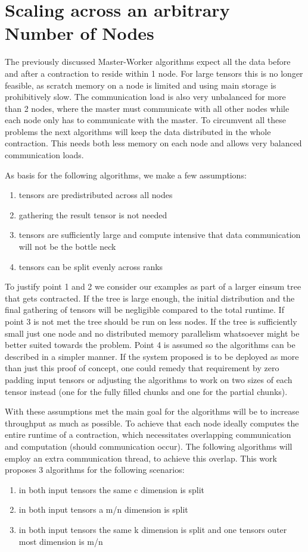 \section{Scaling across an arbitrary Number of Nodes}

The previously discussed Master-Worker algorithms expect all the data before and after a contraction to reside within 1 node.
For large tensors this is no longer feasible, as scratch memory on a node is limited and using main storage is prohibitively slow.
The communication load is also very unbalanced for more than 2 nodes, where the master must communicate with all other nodes while each node only has to communicate with the master.
To circumvent all these problems the next algorithms will keep the data distributed in the whole contraction.
This needs both less memory on each node and allows very balanced communication loads.

As basis for the following algorithms, we make a few assumptions:
\begin{enumerate}
    \item tensors are predistributed across all nodes 
    \item gathering the result tensor is not needed
    \item tensors are sufficiently large and compute intensive that data communication will not be the bottle neck
    \item tensors can be split evenly across ranks
\end{enumerate}

To justify point 1 and 2 we consider our examples as part of a larger einsum tree that gets contracted.
If the tree is large enough, the initial distribution and the final gathering of tensors will be negligible compared to the total runtime.
If point 3 is not met the tree should be run on less nodes.
If the tree is sufficiently small just one node and no distributed memory parallelism whatsoever might be better suited towards the problem.
Point 4 is assumed so the algorithms can be described in a simpler manner.
If the system proposed is to be deployed as more than just this proof of concept, one could remedy that requirement by zero padding input tensors or adjusting the algorithms to work on two sizes of each tensor instead (one for the fully filled chunks and one for the partial chunks).

With these assumptions met the main goal for the algorithms will be to increase throughput as much as possible.
To achieve that each node ideally computes the entire runtime of a contraction, which necessitates overlapping communication and computation (should communication occur).
The following algorithms will employ an extra communication thread, to achieve this overlap.
This work proposes 3 algorithms for the following scenarios:
\begin{enumerate}
    \item in both input tensors the same c dimension is split
    \item in both input tensors a m/n dimension is split
    \item in both input tensors the same k dimension is split and one tensors outer most dimension is m/n
\end{enumerate}

